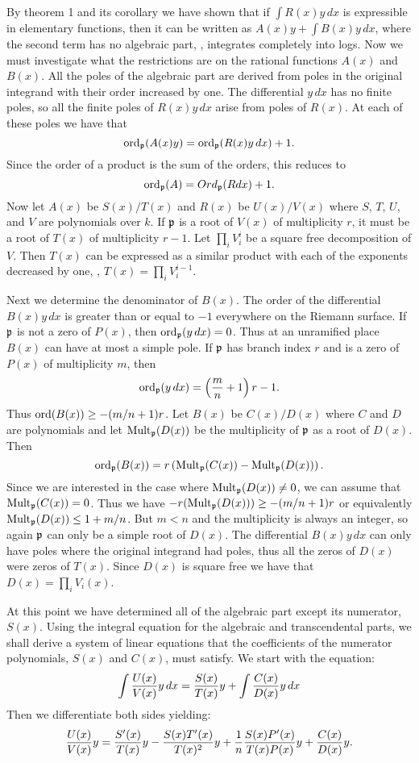 By theorem 1 and its corollary we have  shown  that if
$\int R(x)y\,dx$ is expressible in elementary functions, then it
can be written as $A(x)y + \int	B(x)y\,dx$, where the second term
has no algebraic part, \ie, integrates completely into logs.
Now we must investigate what the restrictions are on the
rational functions $A(x)$ and $B(x)$.  All the poles of the algebraic
part are derived from poles in the original integrand with
their order increased  by one.  
The differential $y\,dx$ has no finite poles, so all the finite poles
of $R(x)y\,dx$ arise from poles of $R(x)$.  At each of these poles
we have that 
\[
\mathop{\rm ord}\nolimits_{{\mathfrak p}}(A(x)y) = \mathop{\rm ord}\nolimits_{{\mathfrak p}}(R(x)y\,dx) + 1.
\]
Since the order of a product is the sum of the orders, this reduces to 
\[
\mathop{\rm ord}\nolimits_{{\mathfrak p}}(A) = Ord_{{\mathfrak p}}(Rdx) + 1.
\]
Now let $A(x)$ be $S(x)/T(x)$ and $R(x)$ be $U(x)/V(x)$ where $S$, $T$, $U$,
and $V$ are polynomials over $k$.  If ${\mathfrak p}$ is a root of $V(x)$ of
multiplicity $r$, it must be a root of $T(x)$ of multiplicity $r-1$.  Let
$\prod_i V_i^i$ be
a square free decomposition of $V$.  Then $T(x)$ can be expressed
as a similar product with each of the exponents decreased by one, \ie,
$T(x) = \prod_i V_i^{i-1}$.

Next we determine the denominator of $B(x)$.  The order of
the differential $B(x)y\,dx$ is greater than or equal to $-1$ everywhere on
the Riemann surface.  If ${\mathfrak p}$ is not a zero of $P(x)$, then
$\mathop{\rm ord}\nolimits_{{\mathfrak p}}(y\,dx) = 0$. 
Thus at an unramified place $B(x)$ can have at most a simple pole.
If ${\mathfrak p}$ has branch index $r$ and is a zero of $P(x)$ of multiplicity $m$,
then 
\[
\mathop{\rm ord}\nolimits_{{\mathfrak p}}(y\,dx) = \left({m \over n} + 1\right) r -1.
\]
Thus $\mathop{\rm ord}\nolimits(B(x)) \ge -(m/n+1)r$.  Let $B(x)$ be $C(x)/D(x)$ where $C$ and $D$
are polynomials and let $\mathop{\rm Mult}\nolimits_{{\mathfrak p}}(D(x))$ be the multiplicity of
${\mathfrak p}$ as a root of $D(x)$. 
Then
\[
\mathop{\rm ord}\nolimits_{{\mathfrak p}}(B(x)) = r\left(\mathop{\rm Mult}\nolimits_{{\mathfrak p}}(C(x)) -
\mathop{\rm Mult}\nolimits_{{\mathfrak p}}(D(x))\right).
\]
Since we are interested in the case where $\mathop{\rm Mult}\nolimits_{{\mathfrak p}}(D(x)) \not=  0$,
we can assume that $\mathop{\rm Mult}\nolimits_{{\mathfrak p}}(C(x))=0$.  Thus we have
$-r(\mathop{\rm Mult}\nolimits_{{\mathfrak p}}(D(x))) \ge -(m/n+1)r$ or equivalently
$\mathop{\rm Mult}\nolimits_{{\mathfrak p}}(D(x)) \le 1+m/n$.  But $m<n$ and the multiplicity is
always an integer, so again ${\mathfrak p}$ can only be a simple root of $D(x)$.
The differential $B(x)y\,dx$ can only have poles where the original
integrand had poles, thus all the zeros of $D(x)$ were zeros of $T(x)$.
Since $D(x)$ is square free we have that $D(x) = \prod_i V_i(x)$.

At this point we have determined all of the algebraic part
except its numerator, $S(x)$.  Using the integral equation
for the algebraic and transcendental parts, we shall derive a system
of linear equations that the coefficients of the numerator polynomials,
$S(x)$ and $C(x)$, must satisfy.  We start with the equation:
\[
\int {U(x) \over V(x)} y\, dx =
{S(x) \over T(x)} y + \int {C(x) \over D(x)} y \, dx
\]
Then we differentiate both sides yielding:
\[
{U(x) \over V(x)} y = {S'(x) \over T(x)} y - 
{S(x) T'(x) \over T(x)^2} y + 
{1 \over n} {S(x) P'(x) \over T(x) P(x)} y
+ {C(x) \over D(x)} y.
\]

